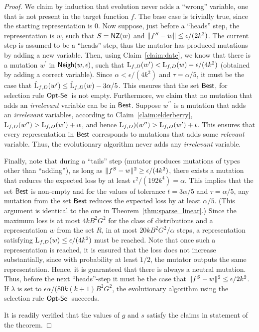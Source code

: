 \begin{proof}
We claim by induction that evolution never adds a ``wrong'' variable, \ie one
that is not present in the target function $f$. The base case is trivially true,
since the starting representation is $0$. Now suppose, just before a ``heads''
step, the representation is $w$, such that $S = \mathsf{NZ}(w)$ and $\Vert f^S - w \Vert
\leq \epsilon/(2k^2)$. The current step is assumed to be a ``heads'' step, thus
the mutator has produced mutations by adding a new variable. Then, using
Claim~\ref{claim:date}, we know that there is a mutation $w^\prime$ in
$\mathsf{Neigh}(w, \epsilon)$, such that $\mathrm{L}_{f, D}(w^\prime) < \mathrm{L}_{f, D}(w) -
\epsilon/(4k^2)$ (obtained by adding a correct variable). Since $\alpha <
\epsilon/(4k^2)$ and $\tau = \alpha/5$, it must be the case that
$\hat{\mathrm{L}}_{f, D}(w^\prime) \leq \hat{\mathrm{L}}_{f, D}(w) - 3 \alpha/5$. This
ensures that the set $\mathsf{Best}$, for selection rule $\mathsf{Opt\mbox{-}Sel}$ is not empty.
Furthermore, we claim that no mutation that adds an \emph{irrelevant} variable
can be in $\mathsf{Best}$. Suppose $w^{\prime\prime}$ is a mutation that adds an
\emph{irrelevant} variables, according to Claim~\ref{claim:elderberry},
$\mathrm{L}_{f, D}(w^{\prime\prime})> \mathrm{L}_{f, D}(w^\prime) + \alpha$, and hence
$\mathrm{L}_{f, D})(w^{\prime\prime}) > \mathrm{L}_{f, D}(w^\prime) + t$. This ensures
that every representation in $\mathsf{Best}$ corresponds to mutations that adds some
\emph{relevant} variable. Thus, the evolutionary algorithm never adds any
\emph{irrelevant} variable.

Finally, note that during a ``tails'' step (mutator produces mutations of types
other than ``adding''), as long as $\Vert f^S - w \Vert^2 \geq \epsilon/(4k^2)$,
there exists a mutation that reduces the expected loss by at least
$\epsilon^2/(192k^4) = \alpha$. This implies that the set $\mathsf{Best}$ is non-empty
and for the values of tolerance $t = 3\alpha/5$ and $\tau = \alpha/5$, any
mutation from the set $\mathsf{Best}$ reduces the expected loss by at least $\alpha/5$.
(This argument is identical to the one in Theorem~\ref{thm:sparse_linear}.)
Since the maximum loss is at most $4kB^2G^2$ for the class of distributions and
a representation $w$ from the set $R$, in at most $20kB^2G^2/\alpha$ steps, a
representation satisfying $\mathrm{L}_{f, D}(w) \leq \epsilon/(4k^2)$ must be
reached. Note that once such a representation is reached, it is ensured that the
loss does not increase substantially, since with probability at least $1/2$, the
mutator outputs the same representation. Hence, it is guaranteed that there is
always a neutral mutation. Thus, before the next ``heads''-step it must be the
case that $\Vert f^S - w \Vert^2 \leq \epsilon/2k^2$. If $\lambda$ is set to
$\epsilon\alpha/(80 k(k+1)B^2G^2$, the evolutionary algorithm using the
selection rule $\mathsf{Opt\mbox{-}Sel}$ succeeds. 

It is readily verified that the values of $g$ and $s$ satisfy the claims in
statement of the theorem.
\end{proof}

